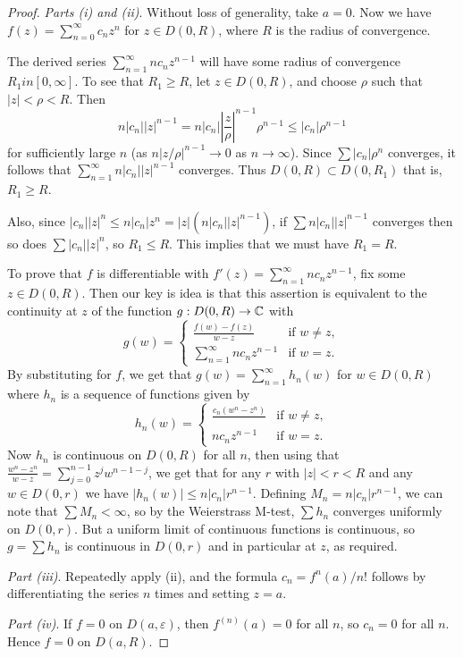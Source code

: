 \documentclass[a4paper]{scrartcl}
\begin{document}
\begin{proof}
    \emph{Parts (i) and (ii)}. Without loss of generality, take $a = 0$. Now we have $f(z) = \sum_{n = 0}^{\infty} c_n z^n$ for $z \in D(0, R)$, where $R$ is the radius of convergence.

    The derived series $\sum_{n = 1}^{\infty} n c_n z^{n - 1}$ will have some radius of convergence $R_1 in [0, \infty]$. To see that $R_1 \geq R$, let $z \in D(0, R)$, and choose $\rho$ such that $|z| < \rho < R$. Then
    $$
n|c_n||z|^{n - 1} = n |c_n| \left|\frac{z}{\rho}\right|^{n - 1}\rho^{n - 1} \leq |c_n|\rho^{n - 1}
    $$
    for sufficiently large $n$ (as $n |z/\rho|^{n - 1} \rightarrow 0$ as $n \rightarrow \infty$). Since $\sum |c_n| \rho^n$ converges, it follows that $\sum_{n = 1}^{\infty} n|c_n||z|^{n - 1}$ converges. Thus $D(0, R) \subset D(0, R_1)$ that is, $R_1 \geq R$.

    Also, since $|c_n||z|^n \leq n |c_n| z^n = |z|(n |c_n||z|^{n - 1})$, if $\sum n |c_n||z|^{n - 1}$ converges then so does $\sum |c_n||z|^n$, so $R_1 \leq R$. This implies that we must have $R_1 = R$.

    To prove that $f$ is differentiable with $f'(z) = \sum_{n = 1}^{\infty} n c_n z^{n - 1}$, fix some $z \in D(0, R)$. Then our key is idea is that this assertion is equivalent to the continuity at $z$ of the function $g: D(0, R) \rightarrow \mathbb{C}$ with
    $$
    g(w) =\begin{cases}
        \frac{f(w) -f(z)}{w - z} &\mbox{if } w \neq z, \\
        \sum_{n = 1}^{\infty} n c_n z^{n - 1} &\mbox{if } w = z.
       \end{cases}
    $$
    By substituting for $f$, we get that $g(w) = \sum_{n = 1}^{\infty} h_n(w)$ for $w \in D(0, R)$ where $h_n$ is a sequence of functions given by
    $$
h_n(w) = \begin{cases}
    \frac{c_n(w^n - z^n)}{} &\mbox{if } w \neq z, \\
    n c_n z^{n - 1} &\mbox{if } w = z.
   \end{cases}
    $$
    Now $h_n$ is continuous on $D(0, R)$ for all $n$, then using that $\frac{w^n - z^n}{w - z} = \sum_{j = 0}^{n - 1} z^j w^{n - 1 - j}$, we get that for any $r$ with $|z| < r < R$ and any $w \in D(0, r)$ we have $|h_n(w)| \leq n|c_n|r^{n - 1}$. Defining $M_n = n |c_n|r^{n - 1}$, we can note that $\sum M_n < \infty$, so by the Weierstrass M-test, $\sum h_n$ converges uniformly on $D(0, r)$. But a uniform limit of continuous functions is continuous, so $g = \sum h_n$ is continuous in $D(0, r)$ and in particular at $z$, as required.

    \emph{Part (iii)}. Repeatedly apply (ii), and the formula $c_n = f^{n}(a)/n!$ follows by differentiating the series $n$ times and setting $z = a$.

    \emph{Part (iv)}. If $f = 0$ on $D(a, \varepsilon)$, then $f^{(n)}(a) = 0$ for all $n$, so $c_n = 0$ for all $n$. Hence $f = 0$ on $D(a, R)$.
\end{proof}
\end{document}
